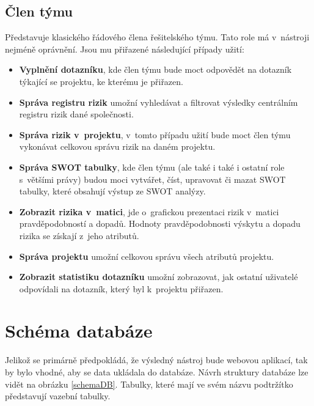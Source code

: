 \subsection*{Člen týmu}

Představuje klasického řádového člena řešitelského týmu. Tato role má v~nástroji nejméně oprávnění. Jsou mu přiřazené následující případy užití: 

\begin{itemize}
    \item \textbf{Vyplnění dotazníku}, kde člen týmu bude moct odpovědět na dotazník týkající se projektu, ke kterému je přiřazen.
    \item \textbf{Správa registru rizik} umožní vyhledávat a filtrovat výsledky centrálním registru rizik dané společnosti.
    \item \textbf{Správa rizik v~projektu}, v~tomto případu užití bude moct člen týmu vykonávat celkovou správu rizik na daném projektu.
    \item \textbf{Správa SWOT tabulky}, kde člen týmu (ale také i také i ostatní role s~většími právy) budou moci vytvářet, číst, upravovat či mazat SWOT tabulky, které obsahují výstup ze SWOT analýzy.
    \item \textbf{Zobrazit rizika v~matici}, jde o~grafickou prezentaci rizik v~matici pravděpodobností a dopadů. Hodnoty pravděpodobnosti výskytu a dopadu rizika se získají z~jeho atributů.
     \item \textbf{Správa projektu} umožní celkovou správu všech atributů projektu.
     \item \textbf{Zobrazit statistiku dotazníku} umožní zobrazovat, jak ostatní uživatelé odpovídali na dotazník, který byl k~projektu přiřazen.
\end{itemize}

\section{Schéma databáze}
\label{databaze}

Jelikož se primárně předpokládá, že výsledný nástroj bude webovou aplikací, tak by bylo vhodné, aby se data ukládala do databáze. Návrh struktury databáze lze vidět na obrázku \ref{schemaDB}. Tabulky, které mají ve svém názvu podtržítko představují vazební tabulky.

